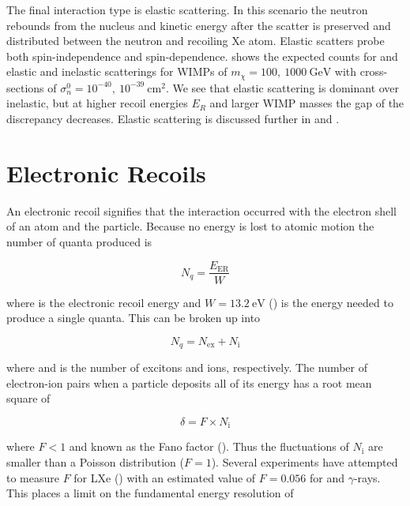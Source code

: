 The final interaction type is elastic scattering.  In this scenario the neutron rebounds from the nucleus and kinetic energy after the
scatter is preserved and distributed between the neutron and recoiling Xe atom.  Elastic scatters probe both spin-independence
and spin-dependence.   shows the expected counts for  and  elastic and
inelastic scatterings for WIMPs of $m_{\chi} = 100,\ 1000\ \mathrm{GeV}$ with cross-sections of
$\sigma_{n}^{0} = 10^{-40},\ 10^{-39}\ \mathrm{cm^{2}}$.  We see that elastic scattering is dominant over inelastic, but at higher recoil
energies $E_{R}$ and larger WIMP masses the gap of the discrepancy decreases.  Elastic scattering is discussed further in
 and \chapref{}.


\section{Electronic Recoils}
\label{sec:er}
An electronic recoil signifies that the interaction occurred with the electron shell of an atom and the particle.  Because no energy
is lost to atomic motion the number of quanta produced is

\begin{equation}
N_{q} = \frac{E_{\mathrm{ER}}}{W}
\label{eq:nquant_er}
\end{equation}

\noindent where \energyer is the electronic recoil energy
and $W = 13.2\ \mathrm{eV}$ () is the energy needed to produce a single quanta.  This can be broken up into

\begin{equation}
N_{q} = N_{\mathrm{ex}} + N_{\mathrm{i}}
\label{eq:quanta}
\end{equation}

\noindent where \nex and \nion is the number of excitons and ions, respectively.  The number of electron-ion pairs when a particle
deposits all of its energy has a root mean square of

\begin{equation}
\delta = F \times N_{\mathrm{i}}
\label{eq:fano}
\end{equation}

\noindent where $F < 1$ and known as the Fano factor ().  Thus the fluctuations of $N_{\mathrm{i}}$ are smaller than a
Poisson
distribution ($F = 1$).  Several experiments have attempted to measure $F$ for LXe () with an
estimated value of $F = 0.056$ for \electron and $\gamma$-rays.  This places a limit on the fundamental energy resolution of

